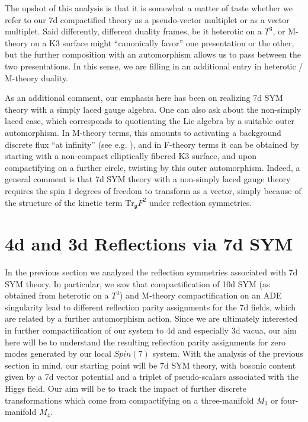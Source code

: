 \documentclass[12pt]{article}%
\numberwithin{equation}{section}
\renewcommand{\(}{\left(}
\renewcommand{\)}{\right)}
\renewcommand{\[}{\left[}
\renewcommand{\]}{\right]}
\begin{document}
The upshot of this analysis is that it is somewhat a matter of taste whether we refer to our 7d compactified theory as a pseudo-vector multiplet or as a vector multiplet. Said differently, different duality frames, be it heterotic on a $T^3$, or M-theory on a K3 surface might ``canonically favor'' one presentation or the other, but the further composition with an automorphism allows us to pass between the two presentations. In this sense, we are filling in an additional entry in heterotic / M-theory duality.

As an additional comment, our emphasis here has been on realizing 7d SYM theory with a simply laced gauge algebra. One can also ask about the non-simply laced case, which corresponds to quotienting the Lie algebra by a suitable outer automorphism. In M-theory terms, this amounts to activating a background discrete flux ``at infinity'' (see e.g. \cite{Witten:1997bs, deBoer:2001wca, Tachikawa:2015wka}), and in F-theory terms it can be obtained by starting with a non-compact elliptically fibered K3 surface, and upon compactifying on a further circle, twisting by this outer automorphism. Indeed, a general comment is that 7d SYM theory with a non-simply laced gauge theory requires the spin $1$ degrees of freedom to transform as a vector, simply because of the structure of the kinetic term $\mathrm{Tr}_{\mathfrak{g}} F^2$ under reflection symmetries.


\section{4d and 3d Reflections via 7d SYM \label{sec:4D3D}}

In the previous section we analyzed the reflection symmetries associated with 7d SYM theory.
In particular, we saw that compactification of 10d SYM (as obtained from heterotic on a $T^3$) and
M-theory compactification on an ADE singularity lead to different reflection parity assignments for the 7d fields, which are
related by a further automorphism action. Since we are ultimately interested in further compactification
of our system to 4d and especially 3d vacua, our aim here will be to understand the resulting reflection parity
assignments for zero modes generated by our local $Spin(7)$ system. With the analysis of the previous section in mind,
our starting point will be 7d SYM theory, with bosonic content
given by a 7d vector potential and a triplet of pseudo-scalars associated with the Higgs field. Our aim will be to track
the impact of further discrete transformations which come from compactifying on a three-manifold $M_3$ or four-manifold $M_4$.
\end{document}
